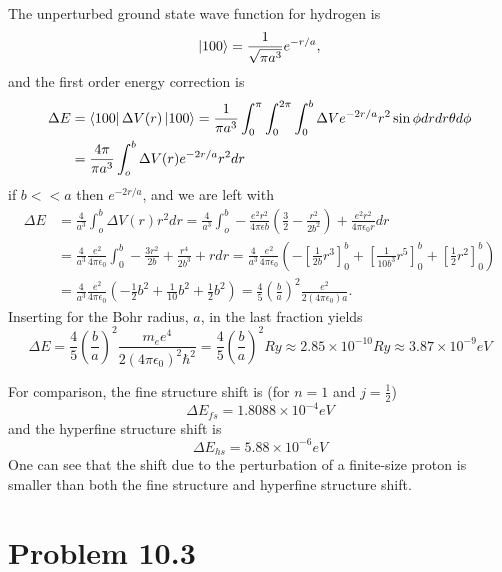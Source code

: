 \documentclass[11pt]{amsart}
\begin{document}
The unperturbed ground state wave function for hydrogen is
\begin{equation}
\label{eq:unperturbedhydrogenground}
\ket{100} = \frac{1}{\sqrt{\pi a^3}}e^{-r/a},
\end{equation}
and the first order energy correction is
\begin{align*}
\Delta E	&= \bra{100}\Delta V(r)\ket{100} = \frac{1}{\pi a^3}\int_0^\pi\int_0^{2\pi}\int_0^b \Delta V e^{-2r/a}r^2\sin\phi dr dr\theta d\phi \\
			&= \frac{4\pi}{\pi a^3} \int_o^b \Delta V(r) e^{-2r/a} r^2 dr
\end{align*}
if $b << a$ then $e^{-2r/a}$, and we are left with
\begin{align*}
\Delta E	&= \frac{4}{a^3} \int_o^b \Delta V(r) r^2 dr = \frac{4}{a^3}\int_o^b -\frac{e^2 r^2}{4\pi\epsilon b} \left(\frac{3}{2} -\frac{r^2}{2b^2} \right) + \frac{e^2r^2}{4\pi\epsilon_0 r} dr \\
			&= \frac{4}{a^3}\frac{e^2}{4\pi\epsilon_0} \int_0^b -\frac{3r^2}{2b} + \frac{r^4}{2b^3} + r dr = \frac{4}{a^3}\frac{e^2}{4\pi\epsilon_0} \left(-\left[\frac{1}{2b}r^3 \right]_0^b + \left[\frac{1}{10b^3}r^5 \right]_0^b + \left[\frac{1}{2}r^2 \right]_0^b \right) \\
			&= \frac{4}{a^3}\frac{e^2}{4\pi\epsilon_0} \left(-\frac{1}{2}b^2 + \frac{1}{10}b^2 + \frac{1}{2}b^2 \right) = \frac{4}{5}\left(\frac{b}{a} \right)^2 \frac{e^2}{2(4\pi\epsilon_0)a}.
\end{align*}
Inserting for the Bohr radius, $a$, in the last fraction yields
\begin{equation}
\Delta E = \frac{4}{5}\left(\frac{b}{a}\right)^2\frac{m_e e^4}{2(4\pi\epsilon_0)^2\hbar^2}=\frac{4}{5}\left(\frac{b}{a}\right)^2Ry \approx 2.85 \times 10^{-10} Ry \approx 3.87 \times 10^{-9}eV 
\end{equation}

For comparison, the fine structure shift is (for $n=1$ and $j=\frac{1}{2}$)
\begin{equation*}
\Delta E_{fs} = 1.8088\times10^{-4}eV
\end{equation*}
and the hyperfine structure shift is
\begin{equation*}
\Delta E_{hs} = 5.88\times10^{-6}eV
\end{equation*}
One can see that the shift due to the perturbation of a finite-size proton is smaller than both the fine structure and hyperfine structure shift.

\section*{Problem 10.3}
\end{document}
